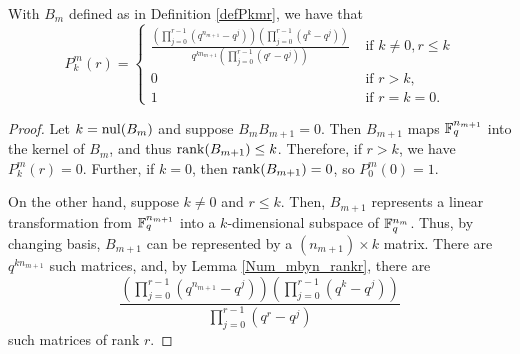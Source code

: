 \begin{lemma}\label{lemPkmr} With $B_m$ defined as in Definition \ref{defPkmr}, we have that
\[
P^m_k(r) = \begin{cases}
  {\displaystyle \frac{\left(\prod_{j=0}^{r-1}\left(q^{n_{m+1}}-q^{j}\right)\right)
  \left(\prod_{j=0}^{r-1}\left(q^k - q^j \right) \right)}
  {q^{kn_{m+1}} \left(\prod_{j=0}^{r-1} \left(q^r-q^j\right)\right)}}
            					& \textrm{ if } k\neq 0, r \leq k \\
           0					& \textrm{ if }  r>k,\\
           1					& \textrm{ if } r = k = 0.
            \end{cases}
\]
\end{lemma}
\begin{proof}
Let $k= \mathrm{nul}(B_{m})$ and suppose $B_mB_{m+1} = 0$.  Then $B_{m+1}$ maps $\mathbb{F}_q^{n_{m+1}}$ into the kernel of $B_m$, and thus $\operatorname{\mathrm{rank}}(B_{m+1}) \leq k$.  Therefore, if $r>k$, we have $P^m_k(r) = 0$.  Further, if $k=0$, then $\operatorname{\mathrm{rank}}(B_{m+1}) = 0$, so $P^m_0(0) = 1$.

On the other hand, suppose $k\neq 0$ and $r\leq k$.  Then, $B_{m+1}$ represents a linear transformation from $\mathbb{F}_q^{n_{m+1}}$ into a $k$-dimensional subspace of $\mathbb{F}_q^{n_{m}}$. Thus, by changing basis, $B_{m+1}$ can be represented by a $(n_{m+1}) \times k$ matrix.  There are $q^{kn_{m+1}}$ such matrices, and, by Lemma \ref{Num_mbyn_rankr}, there are 
\[
 \displaystyle \frac{\left(\prod_{j=0}^{r-1}\left(q^{n_{m+1}}-q^{j}\right)\right)
  \left(\prod_{j=0}^{r-1}\left(q^k - q^j \right) \right)}
  {\prod_{j=0}^{r-1} \left(q^r-q^j\right)}
\]
such matrices of rank $r$.

\end{proof}